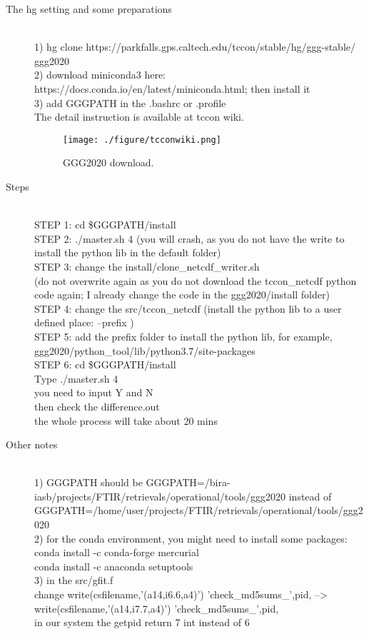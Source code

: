 \documentclass{article}
\begin{document}
\begin{description}
\item[The hg setting and some preparations] \hfill \\
1) hg clone https://parkfalls.gps.caltech.edu/tccon/stable/hg/ggg-stable/ ggg2020  \\
2) download miniconda3 here: https://docs.conda.io/en/latest/miniconda.html; then install it\\
3) add GGGPATH in the .bashrc or .profile\\

The detail instruction is available at tccon wiki.  
\begin{figure}[h]
\begin{center}
\texttt{[image: ./figure/tcconwiki.png]} 
\caption{GGG2020 download.}
\end{center}
\end{figure}


\item[Steps] \hfill \\
STEP 1: cd \$GGGPATH/install  \\
STEP 2: ./master.sh 4  (you will crash, as you do not have the write to install the python lib in the default folder) \\
STEP 3: change the  install/clone\_netcdf\_writer.sh \\
(do not overwrite again as you do not download the tccon\_netcdf python code again; I already change the code in the ggg2020/install folder) \\
STEP 4: change the src/tccon\_netcdf 
(install the python lib to a user defined place: --prefix  )\\
STEP 5: add the prefix folder to install the python lib, for example, ggg2020/python\_tool/lib/python3.7/site-packages \\
STEP 6: cd \$GGGPATH/install  \\
Type ./master.sh 4\\
you need to input Y and N \\
then check the difference.out \\
the whole process will take about 20 mins\\


\item[Other notes]\hfill \\
1) GGGPATH should be GGGPATH=/bira-iasb/projects/FTIR/retrievals/operational/tools/ggg2020 instead of GGGPATH=/home/user/projects/FTIR/retrievals/operational/tools/ggg2020\\
2) for the conda environment, you might need to install some packages:\\
conda install -c conda-forge mercurial\\
conda install -c anaconda setuptools\\
3) in the src/gfit.f\\
change write(csfilename,'(a14,i6.6,a4)') 'check\_md5sums\_',pid,    -->     write(csfilename,'(a14,i7.7,a4)') 'check\_md5sums\_',pid,\\
in our system the getpid return 7 int instead of 6\\


\end{description}
\end{document}
